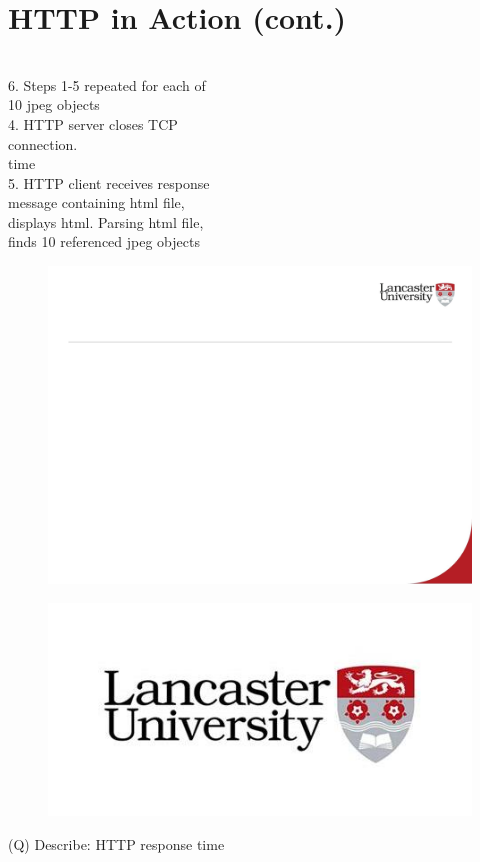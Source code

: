 \documentclass[12pt]{article}
\begin{document}
\section{HTTP in Action (cont.)}
\\
6. Steps 1-5 repeated for each of \\
10 jpeg objects\\
4. HTTP server closes TCP \\
connection. \\
time\\
5. HTTP client receives response \\
message containing html file, \\
displays html.  Parsing html file, \\
finds 10 referenced jpeg objects\\
\begin{figure}[H]
\includegraphics[width=0.5\linewidth]{page25-image-1.png}
\end{figure}
\begin{figure}[H]
\includegraphics[width=0.5\linewidth]{page25-image-2.png}
\end{figure}
\clearpage
(Q)
Describe: HTTP response time
\clearpage
\end{document}
